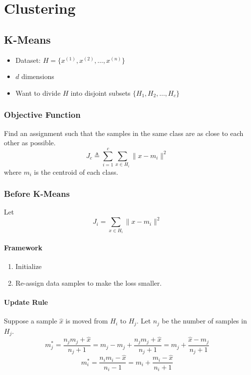 \chapter{Clustering}
\newpage


\section{K-Means}
    \begin{itemize}
        \item Dataset: $H=\{x^{(1)},x^{(2)},\dots,x^{(n)}\}$
        \item $d$ dimensions
        \item Want to divide $H$ into disjoint subsets $\{H_1,H_2,\dots,H_c\}$
    \end{itemize}

    \subsection{Objective Function}
        Find an assignment such that the samples in the same class are as close to each other as possible.
        \[ J_c \triangleq \sum_{i=1}^c\sum_{x\in H_i} \|x-m_i\|^2 \]
        where $m_i$ is the centroid of each class.

    \subsection{Before K-Means}
        Let
        \[ J_i = \sum_{x\in H_i}\|x-m_i\|^2 \]

        \subsubsection{Framework}
        \begin{enumerate}
            \item Initialize
            \item Re-assign data samples to make the loss smaller.
        \end{enumerate}

        \subsubsection{Update Rule}
        Suppose a sample $\hat{x}$ is moved from $H_i$ to $H_j$. Let $n_j$ be the number of samples in $H_j$.
        \[ m^*_j = \frac{n_jm_j + \hat{x}}{n_j+1} = m_j - m_j + \frac{n_jm_j + \hat{x}}{n_j+1} = m_j + \frac{\hat{x}-m_j}{n_j+1} \]
        \[ m^*_i = \frac{n_im_i - \hat{x}}{n_i-1} = m_i + \frac{m_i - \hat{x}}{n_i+1} \]

